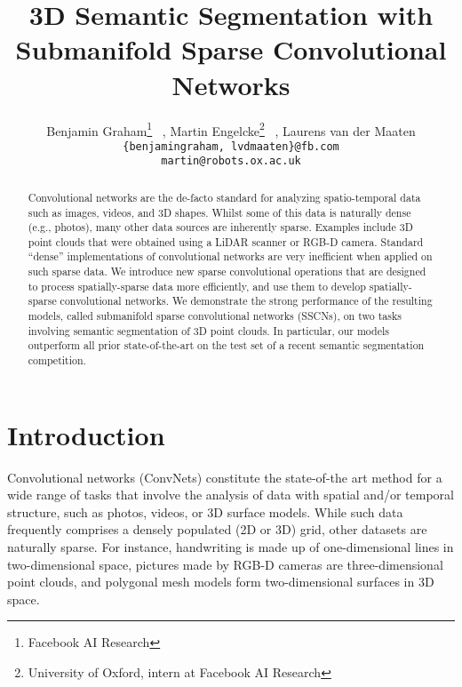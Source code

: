 \documentclass[10pt,twocolumn,letterpaper]{article}
\begin{document}
\title{3D Semantic Segmentation with\\ Submanifold Sparse Convolutional Networks}

\author{
  Benjamin Graham\thanks{Facebook AI Research} ~,
  Martin Engelcke\thanks{University of Oxford, intern at Facebook AI Research} ~,
  Laurens van der Maaten\footnotemark[1]
  \\
  \tt\small{\{benjamingraham, lvdmaaten\}@fb.com} \\
  \tt\small{martin@robots.ox.ac.uk}\\
}
\maketitle



\begin{abstract}
Convolutional networks are the de-facto standard for analyzing spatio-temporal data such as images, videos, and 3D shapes. Whilst some of this data is naturally dense (e.g., photos), many other data sources are inherently sparse. Examples include 3D point clouds that were obtained using a LiDAR scanner or RGB-D camera. Standard ``dense'' implementations of convolutional networks are very inefficient when applied on such sparse data. We introduce new sparse convolutional operations that are designed to process spatially-sparse data more efficiently, and use them to develop spatially-sparse convolutional networks. We demonstrate the strong performance of the resulting models, called submanifold sparse convolutional networks (SSCNs), on two tasks involving semantic segmentation of 3D point clouds.
In particular, our models outperform all prior state-of-the-art on the test set of a recent semantic segmentation competition.
 \end{abstract}


\section{Introduction}

Convolutional networks (ConvNets) constitute the state-of-the art method for a wide range of tasks that involve the analysis
of data with spatial and/or temporal structure, such as photos, videos,
or 3D surface models. While such data frequently comprises a densely populated (2D or 3D) grid, other datasets are naturally sparse. For instance, handwriting is made up of one-dimensional lines in two-dimensional space, pictures made by RGB-D cameras are three-dimensional point clouds, and polygonal mesh models
form two-dimensional surfaces in 3D space.
\end{document}
